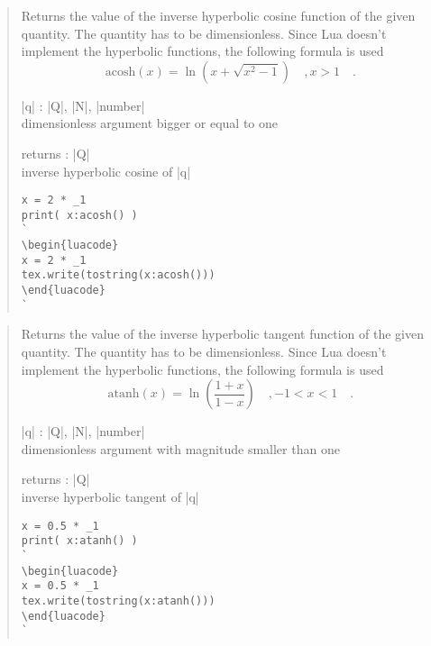\documentclass{ltxdoc}
\begin{document}
\begin{quote}
  Returns the value of the inverse hyperbolic cosine function of the given quantity. The quantity has to be dimensionless. Since Lua doesn't implement the hyperbolic functions, the following formula is used 
  $$
    \text{acosh}(x) = \ln\left( x + \sqrt{x^2 - 1} \right)  \quad, x > 1 \quad.
  $$

  \begin{description}
  \item |q| : |Q|, |N|, |number|\\
    dimensionless argument bigger or equal to one

  \item returns : |Q|\\
    inverse hyperbolic cosine of |q|
  \end{description}


\begin{lstlisting}
x = 2 * _1
print( x:acosh() )
`
\begin{luacode}
x = 2 * _1
tex.write(tostring(x:acosh()))
\end{luacode}
`
\end{lstlisting}

\end{quote}



\begin{quote}
  Returns the value of the inverse hyperbolic tangent function of the given quantity. The quantity has to be dimensionless. Since Lua doesn't implement the hyperbolic functions, the following formula is used 
  $$
    \text{atanh}(x) = \ln\left( \frac{1 + x}{1 - x} \right)  \quad, -1 < x < 1 \quad.
  $$

  \begin{description}
  \item |q| : |Q|, |N|, |number|\\
    dimensionless argument with magnitude smaller than one

  \item returns : |Q|\\
    inverse hyperbolic tangent of |q|
  \end{description}



\begin{lstlisting}
x = 0.5 * _1
print( x:atanh() )
`
\begin{luacode}
x = 0.5 * _1
tex.write(tostring(x:atanh()))
\end{luacode}
`
\end{lstlisting}

\end{quote}
\end{document}
